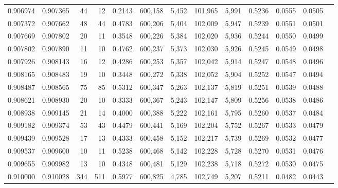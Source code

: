 \begin{tabular}{rrrrrrrrrrrrr}
0.906974 & 0.907365 &    44 &  12 &                                     0.2143 & 600,158 &   5,452 & 101,965 &   5,991 & 0.5236 & 0.0555 & 0.0505 \\
0.907372 & 0.907662 &    48 &  44 &                                     0.4783 & 600,206 &   5,404 & 102,009 &   5,947 & 0.5239 & 0.0551 & 0.0501 \\
0.907669 & 0.907802 &    20 &  11 &                                     0.3548 & 600,226 &   5,384 & 102,020 &   5,936 & 0.5244 & 0.0550 & 0.0499 \\
0.907802 & 0.907890 &    11 &  10 &                                     0.4762 & 600,237 &   5,373 & 102,030 &   5,926 & 0.5245 & 0.0549 & 0.0498 \\
0.907926 & 0.908143 &    16 &  12 &                                     0.4286 & 600,253 &   5,357 & 102,042 &   5,914 & 0.5247 & 0.0548 & 0.0496 \\
0.908165 & 0.908483 &    19 &  10 &                                     0.3448 & 600,272 &   5,338 & 102,052 &   5,904 & 0.5252 & 0.0547 & 0.0494 \\
0.908487 & 0.908565 &    75 &  85 &                                     0.5312 & 600,347 &   5,263 & 102,137 &   5,819 & 0.5251 & 0.0539 & 0.0488 \\
0.908621 & 0.908930 &    20 &  10 &                                     0.3333 & 600,367 &   5,243 & 102,147 &   5,809 & 0.5256 & 0.0538 & 0.0486 \\
0.908938 & 0.909145 &    21 &  14 &                                     0.4000 & 600,388 &   5,222 & 102,161 &   5,795 & 0.5260 & 0.0537 & 0.0484 \\
0.909182 & 0.909374 &    53 &  43 &                                     0.4479 & 600,441 &   5,169 & 102,204 &   5,752 & 0.5267 & 0.0533 & 0.0479 \\
0.909439 & 0.909528 &    17 &  13 &                                     0.4333 & 600,458 &   5,152 & 102,217 &   5,739 & 0.5269 & 0.0532 & 0.0477 \\
0.909537 & 0.909600 &    10 &  11 &                                     0.5238 & 600,468 &   5,142 & 102,228 &   5,728 & 0.5270 & 0.0531 & 0.0476 \\
0.909655 & 0.909982 &    13 &  10 &                                     0.4348 & 600,481 &   5,129 & 102,238 &   5,718 & 0.5272 & 0.0530 & 0.0475 \\
0.910000 & 0.910028 &   344 & 511 &                                     0.5977 & 600,825 &   4,785 & 102,749 &   5,207 & 0.5211 & 0.0482 & 0.0443 \\

\end{tabular}
